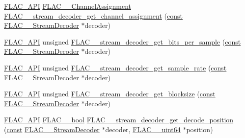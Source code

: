 \begin{DoxyCompactItemize}
\item 
\hyperlink{group__flac__export_ga56ca07df8a23310707732b1c0007d6f5}{F\+L\+A\+C\+\_\+\+A\+PI} \hyperlink{group__flac__format_ga79855f8525672e37f299bbe02952ef9c}{F\+L\+A\+C\+\_\+\+\_\+\+Channel\+Assignment} \hyperlink{group__flac__stream__decoder_gad7906d840eef5c15ef5c8fe4571d1172}{F\+L\+A\+C\+\_\+\+\_\+stream\+\_\+decoder\+\_\+get\+\_\+channel\+\_\+assignment} (\hyperlink{zconf_8h_a2c212835823e3c54a8ab6d95c652660e}{const} \hyperlink{struct_f_l_a_c_____stream_decoder}{F\+L\+A\+C\+\_\+\+\_\+\+Stream\+Decoder} $\ast$decoder)
\item 
\hyperlink{group__flac__export_ga56ca07df8a23310707732b1c0007d6f5}{F\+L\+A\+C\+\_\+\+A\+PI} unsigned \hyperlink{group__flac__stream__decoder_ga2e4bae93f2ebf49babd88bb5fe54bd24}{F\+L\+A\+C\+\_\+\+\_\+stream\+\_\+decoder\+\_\+get\+\_\+bits\+\_\+per\+\_\+sample} (\hyperlink{zconf_8h_a2c212835823e3c54a8ab6d95c652660e}{const} \hyperlink{struct_f_l_a_c_____stream_decoder}{F\+L\+A\+C\+\_\+\+\_\+\+Stream\+Decoder} $\ast$decoder)
\item 
\hyperlink{group__flac__export_ga56ca07df8a23310707732b1c0007d6f5}{F\+L\+A\+C\+\_\+\+A\+PI} unsigned \hyperlink{group__flac__stream__decoder_ga83f1359028e0646c1e50c1aef0d9fd6d}{F\+L\+A\+C\+\_\+\+\_\+stream\+\_\+decoder\+\_\+get\+\_\+sample\+\_\+rate} (\hyperlink{zconf_8h_a2c212835823e3c54a8ab6d95c652660e}{const} \hyperlink{struct_f_l_a_c_____stream_decoder}{F\+L\+A\+C\+\_\+\+\_\+\+Stream\+Decoder} $\ast$decoder)
\item 
\hyperlink{group__flac__export_ga56ca07df8a23310707732b1c0007d6f5}{F\+L\+A\+C\+\_\+\+A\+PI} unsigned \hyperlink{group__flac__stream__decoder_ga9cd4807f4c6ee90338d271048fb28223}{F\+L\+A\+C\+\_\+\+\_\+stream\+\_\+decoder\+\_\+get\+\_\+blocksize} (\hyperlink{zconf_8h_a2c212835823e3c54a8ab6d95c652660e}{const} \hyperlink{struct_f_l_a_c_____stream_decoder}{F\+L\+A\+C\+\_\+\+\_\+\+Stream\+Decoder} $\ast$decoder)
\item 
\hyperlink{group__flac__export_ga56ca07df8a23310707732b1c0007d6f5}{F\+L\+A\+C\+\_\+\+A\+PI} \hyperlink{ordinals_8h_a95103469f1cbd78b8cf250194985b34e}{F\+L\+A\+C\+\_\+\+\_\+bool} \hyperlink{group__flac__stream__decoder_ga11507d25b6fdbd1efd5ee642923730fa}{F\+L\+A\+C\+\_\+\+\_\+stream\+\_\+decoder\+\_\+get\+\_\+decode\+\_\+position} (\hyperlink{zconf_8h_a2c212835823e3c54a8ab6d95c652660e}{const} \hyperlink{struct_f_l_a_c_____stream_decoder}{F\+L\+A\+C\+\_\+\+\_\+\+Stream\+Decoder} $\ast$decoder, \hyperlink{ordinals_8h_aa78c8c70a3eb8a58af7436f278acde8e}{F\+L\+A\+C\+\_\+\+\_\+uint64} $\ast$position)

\end{DoxyCompactItemize}
